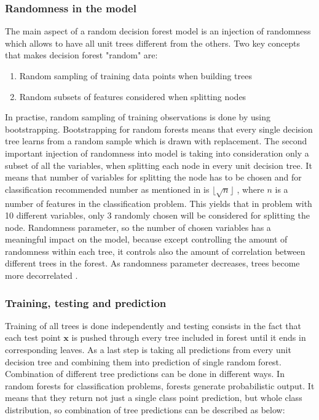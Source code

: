 \subsubsection{Randomness in the model}
The main aspect of a random decision forest model is an injection of randomness which allows to have all unit trees different from the others. Two key concepts that makes decision forest "random" are:
\begin{enumerate}
	\item Random sampling of training data points when building trees
	\item Random subsets of features considered when splitting nodes
\end{enumerate}
In practise, random sampling of training observations is done by using bootstrapping. 
Bootstrapping for random forests means that every single decision tree learns from a random sample which is drawn with replacement. 
The second important injection of randomness into model is taking into consideration only a subset of all the variables, 
when splitting each node in every unit decision tree. It means that number of variables for splitting the node has to be chosen 
and for classification recommended number as mentioned in\cite{friedman2001elements} is $\lfloor{\sqrt{n}} \rfloor$ , 
where $n$ is a number of features in the classification problem. This yields that in problem with 10 different variables, 
only 3 randomly chosen will be considered for splitting the node. Randomness parameter, 
so the number of chosen variables has a meaningful impact on the model, 
because except controlling the amount of randomness within each tree, 
it controls also the amount of correlation between different trees in the forest. 
As randomness parameter decreases, trees become more decorrelated \cite{criminisi2012decision}.

\subsubsection {Training, testing and prediction}
Training of all trees is done independently and testing consists in the fact that each test point $\textbf{x}$ is pushed 
through every tree included in forest until it ends in corresponding leaves. As a last step is taking all predictions from 
every unit decision tree and combining them into prediction of single random forest. Combination of different tree predictions 
can be done in different ways. In random forests for classification problems, forests generate probabilistic output. 
It means that they return not just a single class point prediction, but whole class distribution, 
so combination of tree predictions can be described as below:

